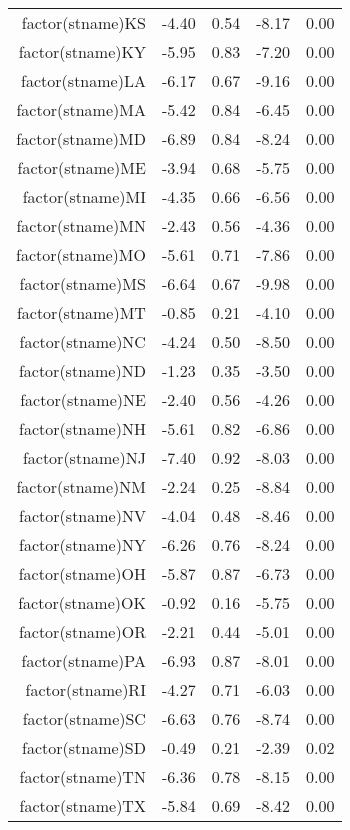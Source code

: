 \begin{table}[ht]
\begin{tabular}{rrrrr}
  factor(stname)KS & -4.40 & 0.54 & -8.17 & 0.00 \\ 
  factor(stname)KY & -5.95 & 0.83 & -7.20 & 0.00 \\ 
  factor(stname)LA & -6.17 & 0.67 & -9.16 & 0.00 \\ 
  factor(stname)MA & -5.42 & 0.84 & -6.45 & 0.00 \\ 
  factor(stname)MD & -6.89 & 0.84 & -8.24 & 0.00 \\ 
  factor(stname)ME & -3.94 & 0.68 & -5.75 & 0.00 \\ 
  factor(stname)MI & -4.35 & 0.66 & -6.56 & 0.00 \\ 
  factor(stname)MN & -2.43 & 0.56 & -4.36 & 0.00 \\ 
  factor(stname)MO & -5.61 & 0.71 & -7.86 & 0.00 \\ 
  factor(stname)MS & -6.64 & 0.67 & -9.98 & 0.00 \\ 
  factor(stname)MT & -0.85 & 0.21 & -4.10 & 0.00 \\ 
  factor(stname)NC & -4.24 & 0.50 & -8.50 & 0.00 \\ 
  factor(stname)ND & -1.23 & 0.35 & -3.50 & 0.00 \\ 
  factor(stname)NE & -2.40 & 0.56 & -4.26 & 0.00 \\ 
  factor(stname)NH & -5.61 & 0.82 & -6.86 & 0.00 \\ 
  factor(stname)NJ & -7.40 & 0.92 & -8.03 & 0.00 \\ 
  factor(stname)NM & -2.24 & 0.25 & -8.84 & 0.00 \\ 
  factor(stname)NV & -4.04 & 0.48 & -8.46 & 0.00 \\ 
  factor(stname)NY & -6.26 & 0.76 & -8.24 & 0.00 \\ 
  factor(stname)OH & -5.87 & 0.87 & -6.73 & 0.00 \\ 
  factor(stname)OK & -0.92 & 0.16 & -5.75 & 0.00 \\ 
  factor(stname)OR & -2.21 & 0.44 & -5.01 & 0.00 \\ 
  factor(stname)PA & -6.93 & 0.87 & -8.01 & 0.00 \\ 
  factor(stname)RI & -4.27 & 0.71 & -6.03 & 0.00 \\ 
  factor(stname)SC & -6.63 & 0.76 & -8.74 & 0.00 \\ 
  factor(stname)SD & -0.49 & 0.21 & -2.39 & 0.02 \\ 
  factor(stname)TN & -6.36 & 0.78 & -8.15 & 0.00 \\ 
  factor(stname)TX & -5.84 & 0.69 & -8.42 & 0.00 \\ 

\end{tabular}
\end{table}

